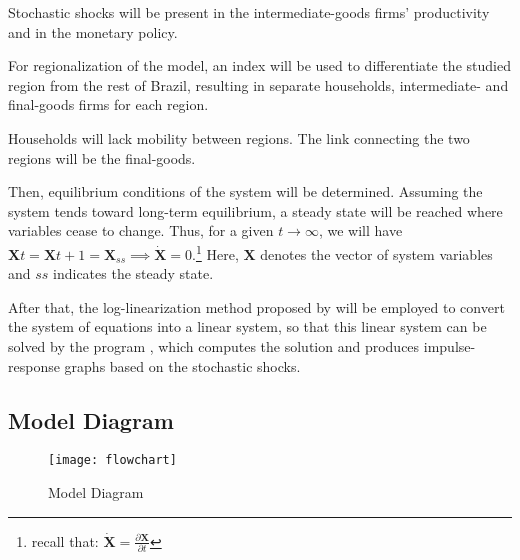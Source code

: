 \documentclass[
	thesis.tex
	]{subfiles}
\begin{document}
	Stochastic shocks will be present in the intermediate-goods firms' productivity and in the monetary policy.
	
	For regionalization of the model, an index will be used to differentiate the studied region from the rest of Brazil, resulting in separate households, intermediate- and final-goods firms for each region.
	
	Households will lack mobility between regions. The link connecting the two regions will be the final-goods.

	Then, equilibrium conditions of the system will be determined. Assuming the system tends toward long-term equilibrium, a steady state will be reached where variables cease to change. Thus, for a given $t \longrightarrow \infty$, we will have $\boldsymbol{X}t = \boldsymbol{X}{t+1} = \boldsymbol{X}_{ss} \implies \boldsymbol{\dot{X}} = 0$.\footnote{recall that: $\boldsymbol{\dot{X}} = \frac{\partial \boldsymbol{X}}{\partial t}$} Here, $\boldsymbol{X}$ denotes the vector of system variables and $ss$ indicates the steady state.
	
	After that, the log-linearization method proposed by \textcite{uhlig_toolkit_1999} will be employed to convert the system of equations into a linear system, so that this linear system can be solved by the program \dynare{}, which computes the solution and produces impulse-response graphs based on the stochastic shocks.



\subsection*{Model Diagram}

\begin{figure}[h!]
	\centering
	\texttt{[image: flowchart]}
	\caption{Model Diagram}
	\label{fig:model-diagram}
\end{figure}

\newpage

\end{document}
